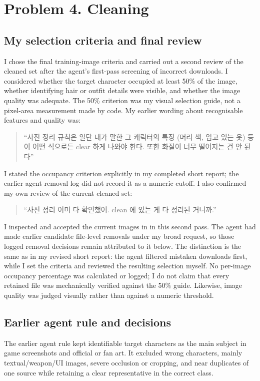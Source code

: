 \documentclass[11pt]{article}
\begin{document}
\section*{Problem 4. Cleaning}
\subsection*{My selection criteria and final review}
I chose the final training-image criteria and carried out a second review of the cleaned set after the agent's first-pass screening of incorrect downloads. I considered whether the target character occupied at least 50\% of the image, whether identifying hair or outfit details were visible, and whether the image quality was adequate. The 50\% criterion was my visual selection guide, not a pixel-area measurement made by code. My earlier wording about recognisable features and quality was:
\begin{quote}
``사진 정리 규칙은 일단 내가 말한 그 캐릭터의 특징 (머리 색, 입고 있는 옷) 등이 어떤 식으로든 clear 하게 나와야 한다. 또한 화질이 너무 떨어지는 건 안 된다''
\end{quote}
I stated the occupancy criterion explicitly in my completed short report; the earlier agent removal log did not record it as a numeric cutoff. I also confirmed my own review of the current cleaned set:
\begin{quote}
``사진 정리 이미 다 확인했어. clean 에 있는 게 다 정리된 거니까.''
\end{quote}
I inspected and accepted the current images in  in this second pass. The agent had made earlier candidate file-level removals under my broad request, so those logged removal decisions remain attributed to it below. The distinction is the same as in my revised short report: the agent filtered mistaken downloads first, while I set the criteria and reviewed the resulting selection myself. No per-image occupancy percentage was calculated or logged; I do not claim that every retained file was mechanically verified against the 50\% guide. Likewise, image quality was judged visually rather than against a numeric threshold.

\subsection*{Earlier agent rule and decisions}
The earlier agent rule kept identifiable target characters as the main subject in game screenshots and official or fan art. It excluded wrong characters, mainly textual/weapon/UI images, severe occlusion or cropping, and near duplicates of one source while retaining a clear representative in the correct class.
\end{document}
